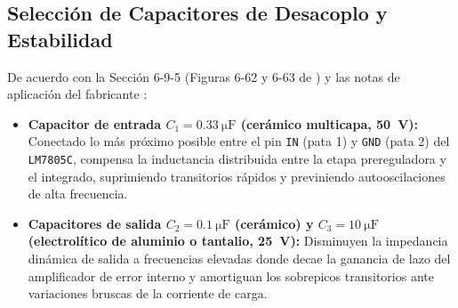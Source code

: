 \subsection{ Selección de Capacitores de Desacoplo y Estabilidad}
De acuerdo con la Sección 6-9-5 (Figuras 6-62 y 6-63 de \cite{gonzalez_p3}) y las notas de aplicación del fabricante \cite{ti_7805}:
\begin{itemize}
    \item \textbf{Capacitor de entrada $C_1 = \SI{0,33}{\micro\farad}$ (cerámico multicapa, \SI{50}{\volt}):} Conectado lo más próximo posible entre el pin \texttt{IN} (pata 1) y \texttt{GND} (pata 2) del \texttt{LM7805C}, compensa la inductancia distribuida entre la etapa prereguladora y el integrado, suprimiendo transitorios rápidos y previniendo autooscilaciones de alta frecuencia.
    \item \textbf{Capacitores de salida $C_2 = \SI{0,1}{\micro\farad}$ (cerámico) y $C_3 = \SI{10}{\micro\farad}$ (electrolítico de aluminio o tantalio, \SI{25}{\volt}):} Disminuyen la impedancia dinámica de salida a frecuencias elevadas donde decae la ganancia de lazo del amplificador de error interno y amortiguan los sobrepicos transitorios ante variaciones bruscas de la corriente de carga.
\end{itemize}

